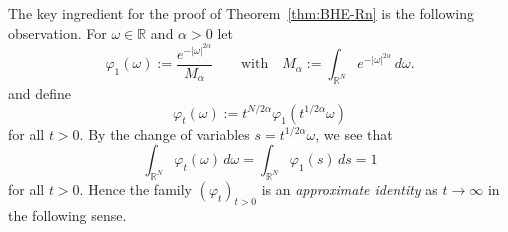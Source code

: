 \documentclass[a4paper, reqno]{amsart}
\numberwithin{equation}{section}
\theoremstyle{plain}
\theoremstyle{definition}
\theoremstyle{remark}
\newcommand{\RR}{\mathbb{R}}
\begin{document}
The key ingredient for the proof of Theorem~\ref{thm:BHE-Rn} is the following observation. For $\omega\in\RR$ and $\alpha>0$ let
\begin{equation*}
  \varphi_1(\omega):=\frac{e^{-|\omega|^{2\alpha}}}{M_\alpha}
  \qquad\text{with}\quad
  M_\alpha:=\int_{\RR^N}e^{-|\omega|^{2\alpha}}\,d\omega.
\end{equation*}
and define
\begin{equation}
  \label{eq:approx-id}
  \varphi_t(\omega):=t^{N/2\alpha}\varphi_1(t^{1/2\alpha}\omega)
\end{equation}
for all $t>0$. By the change of variables $s = t^{1/2\alpha}\omega$, we see that
\begin{equation*}
  \int_{\RR^N} \varphi_t(\omega) \,d\omega
  = \int_{\RR^N} \varphi_1(s) \,ds
  = 1
\end{equation*}
for all $t>0$. Hence the family $(\varphi_t)_{t>0}$ is an \emph{approximate identity} as $t \to \infty$ in the following sense.
\end{document}
